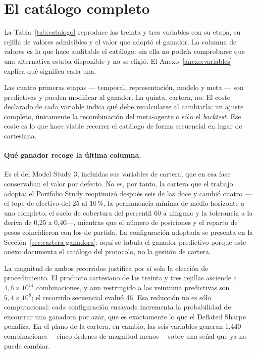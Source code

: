 \section{El catálogo completo}

La Tabla~\ref{tab:catalogo} reproduce las treinta y tres variables con su etapa, su rejilla de
valores admisibles y el valor que adoptó el ganador. La columna de valores es la que hace auditable
el catálogo: sin ella no podría comprobarse que una alternativa estaba disponible y no se eligió.
El Anexo~\ref{anexo:variables} explica qué significa cada una.

{\footnotesize\renewcommand{\_}{\textunderscore\allowbreak}

}

Las cuatro primeras etapas --- temporal, representación, modelo y meta --- son predictivas y pueden
modificar al ganador. La quinta, cartera, no. El coste declarado de cada variable indica qué debe
recalcularse al cambiarla: un ajuste completo, únicamente la recombinación del meta-agente o sólo el
\textit{backtest}. Ese coste es lo que hace viable recorrer el catálogo de forma secuencial en lugar
de cartesiana.

\paragraph{Qué ganador recoge la última columna.} Es el del Model Study 3, incluidas sus
variables de cartera, que en esa fase conservaban el valor por defecto. No es, por tanto, la cartera
que el trabajo adopta: el Portfolio Study reoptimizó después seis de las doce y cambió cuatro ---el
tope de efectivo del 25 al 10\,\%, la permanencia mínima de medio horizonte a uno completo, el suelo
de cobertura del percentil 60 a ninguno y la tolerancia a la deriva de 0,25 a 0,40---, mientras que
el número de posiciones y el reparto de pesos coincidieron con los de partida. La configuración
adoptada se presenta en la Sección~\ref{sec:cartera-ganadora}; aquí se tabula el ganador predictivo
porque este anexo documenta el catálogo del protocolo, no la gestión de cartera.

La magnitud de ambos recorridos justifica por sí sola la elección de procedimiento. El producto
cartesiano de las treinta y tres rejillas asciende a $4{,}6 \times 10^{14}$ combinaciones, y aun
restringido a las veintiuna predictivas son $5{,}4 \times 10^{8}$; el recorrido secuencial evaluó
46. Esa reducción no es sólo computacional: cada configuración ensayada incrementa la probabilidad
de encontrar una ganadora por azar, que es exactamente lo que el Deflated Sharpe penaliza. En el
plano de la cartera, en cambio, las seis variables generan 1.440 combinaciones ---cinco órdenes de
magnitud menos--- sobre una señal que ya no puede cambiar.

